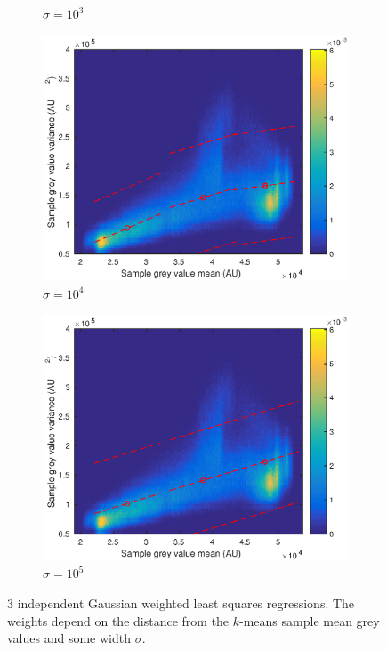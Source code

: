 \documentclass[12pt]{report}
\begin{document}
\begin{figure}
\begin{subfigure}{0.45\textwidth}
		\caption{$\sigma=10^3$}
	\end{subfigure}
	\begin{subfigure}{0.45\textwidth}
		\includegraphics[width=\textwidth]{figures/meanVar/gaussian_3.eps}
		\caption{$\sigma=10^4$}
	\end{subfigure}
	\begin{subfigure}{0.45\textwidth}
		\includegraphics[width=\textwidth]{figures/meanVar/gaussian_4.eps}
		\caption{$\sigma=10^5$}
	\end{subfigure}
	\caption{3 independent Gaussian weighted least squares regressions. The weights depend on the distance from the $k$-means sample mean grey values and some width $\sigma$.}
\end{figure}
\end{document}
